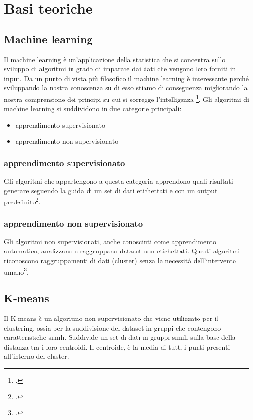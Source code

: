 \chapter{Basi teoriche}
\label{cap:teoria}

\section{Machine learning}
Il machine learning è un'applicazione della statistica che si concentra sullo sviluppo di algoritmi in grado di imparare dai dati che vengono loro forniti in input.
Da un punto di vista più filosofico il machine learning è interessante perché sviluppando la nostra conoscenza su di esso stiamo di conseguenza migliorando la nostra comprensione dei principi su cui si sorregge l'intelligenza \footcite[p.~97]{Goodfellow-et-al-2016}.
Gli algoritmi di machine learning si suddividono in due categorie principali:

\begin{itemize}
    \item apprendimento supervisionato
    \item apprendimento non supervisionato 
\end{itemize}

\subsection{apprendimento supervisionato}
Gli algoritmi che appartengono a questa categoria apprendono quali risultati generare seguendo la guida di un set di dati etichettati e con un output predefinito\footcite{site:machine-learning}.

\subsection{apprendimento non supervisionato}
Gli algoritmi non supervisionati, anche conosciuti come apprendimento automatico, analizzano e raggruppano dataset non etichettati. Questi algoritmi riconoscono raggruppamenti di dati (cluster) senza la necessità dell'intervento umano\footcite{site:machine-learning}.

\section{K-means}
Il K-means è un algoritmo non supervisionato che viene utilizzato per il clustering, ossia per la suddivisione del dataset in gruppi che contengono caratteristiche simili.
Suddivide un set di dati in gruppi simili sulla base della distanza tra i loro centroidi. 
Il centroide, è la media di tutti i punti presenti all'interno del cluster.

